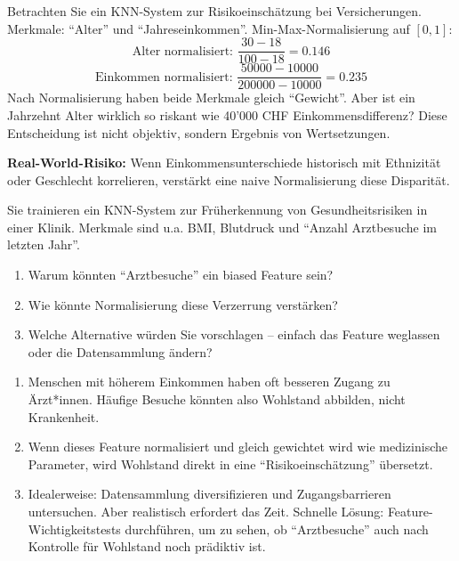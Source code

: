 \begin{myexample}
    Betrachten Sie ein KNN-System zur Risikoeinschätzung bei Versicherungen. Merkmale: \enquote{Alter} und \enquote{Jahreseinkommen}. Min-Max-Normalisierung auf \([0,1]\):
    \[
        \text{Alter normalisiert: } \frac{30-18}{100-18} = 0.146
    \]
    \[
        \text{Einkommen normalisiert: } \frac{50000-10000}{200000-10000} = 0.235
    \]
    Nach Normalisierung haben beide Merkmale gleich \enquote{Gewicht}. Aber ist ein Jahrzehnt Alter wirklich so riskant wie 40'000 CHF Einkommensdifferenz? Diese Entscheidung ist nicht objektiv, sondern Ergebnis von Wertsetzungen.

    \textbf{Real-World-Risiko:} Wenn Einkommensunterschiede historisch mit Ethnizität oder Geschlecht korrelieren, verstärkt eine naive Normalisierung diese Disparität.
\end{myexample}

\begin{mychallenge}
    Sie trainieren ein KNN-System zur Früherkennung von Gesundheitsrisiken in einer Klinik. Merkmale sind u.a. BMI, Blutdruck und \enquote{Anzahl Arztbesuche im letzten Jahr}.
    \begin{enumerate}
        \item Warum könnten \enquote{Arztbesuche} ein biased Feature sein?
        \item Wie könnte Normalisierung diese Verzerrung verstärken?
        \item Welche Alternative würden Sie vorschlagen -- einfach das Feature weglassen oder die Datensammlung ändern?
    \end{enumerate}
    \begin{myanswer}
        \begin{enumerate}
            \item Menschen mit höherem Einkommen haben oft besseren Zugang zu Ärzt*innen. Häufige Besuche könnten also Wohlstand abbilden, nicht Krankenheit.
            \item Wenn dieses Feature normalisiert und gleich gewichtet wird wie medizinische Parameter, wird Wohlstand direkt in eine \enquote{Risikoeinschätzung} übersetzt.
            \item Idealerweise: Datensammlung diversifizieren und Zugangsbarrieren untersuchen. Aber realistisch erfordert das Zeit. Schnelle Lösung: Feature-Wichtigkeitstests durchführen, um zu sehen, ob \enquote{Arztbesuche} auch nach Kontrolle für Wohlstand noch prädiktiv ist.
        \end{enumerate}
    \end{myanswer}
\end{mychallenge}

